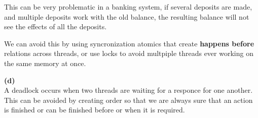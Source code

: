 \documentclass[12pt]{article}
\newcommand{\subtask}[1]{\hspace*{-1cm}\textbf{(#1)}\\[-5mm]}
\begin{document}
This can be very problematic in a banking system, if several deposits are made,
and multiple deposits work with the old balance, the resulting balance will not
see the effects of all the deposits.

We can avoid this by using syncronization atomics that create \textbf{happens before}
relations across threads, or use locks to avoid multpiple threads ever working on the same memory at once.

\subtask{d}
A deadlock occurs when two threads are waiting for a responce for one another.
This can be avoided by creating order so that we are always sure that an action
is finished or can be finished before or when it is required.
\end{document}
